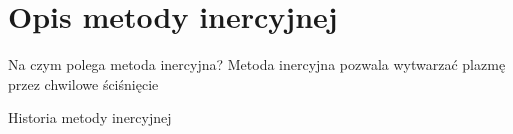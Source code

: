\documentclass[10pt]{beamer}
\begin{document}
    \section{Opis metody inercyjnej}

    \begin{frame}{Na czym polega metoda inercyjna?}
        Metoda inercyjna pozwala wytwarzać plazmę przez chwilowe ściśnięcie 
    \end{frame}

    \begin{frame}{Historia metody inercyjnej}

    \end{frame}
\end{document}
